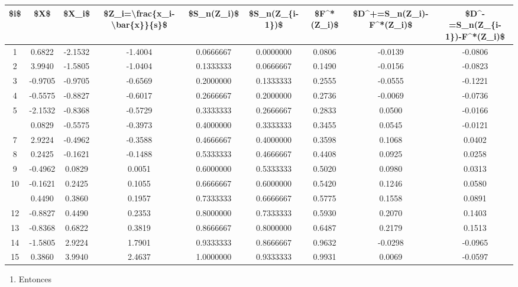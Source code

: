 \documentclass[
  a4paper,
  oneside,
  openany]{book}
\providecommand{\tightlist}{%
  \setlength{\itemsep}{0pt}\setlength{\parskip}{0pt}}
\begin{document}
\begin{table}[H]
\centering
\begin{tabular}{ccccccccc}
\toprule
\$i\$ & \$X\$ & \$X\_i\$ & \$Z\_i=\textbackslash{}frac\{x\_i-\textbackslash{}bar\{x\}\}\{s\}\$ & \$S\_n(Z\_i)\$ & \$S\_n(Z\_\{i-1\})\$ & \$F\textasciicircum{}*(Z\_i)\$ & \$D\textasciicircum{}+=S\_n(Z\_i)-F\textasciicircum{}*(Z\_i)\$ & \$D\textasciicircum{}-=S\_n(Z\_\{i-1\})-F\textasciicircum{}*(Z\_i)\$\\
\midrule
1 & 0.6822 & -2.1532 & -1.4004 & 0.0666667 & 0.0000000 & 0.0806 & -0.0139 & -0.0806\\
2 & 3.9940 & -1.5805 & -1.0404 & 0.1333333 & 0.0666667 & 0.1490 & -0.0156 & -0.0823\\
3 & -0.9705 & -0.9705 & -0.6569 & 0.2000000 & 0.1333333 & 0.2555 & -0.0555 & -0.1221\\
4 & -0.5575 & -0.8827 & -0.6017 & 0.2666667 & 0.2000000 & 0.2736 & -0.0069 & -0.0736\\
5 & -2.1532 & -0.8368 & -0.5729 & 0.3333333 & 0.2666667 & 0.2833 & 0.0500 & -0.0166\\
\addlinespace
6 & 0.0829 & -0.5575 & -0.3973 & 0.4000000 & 0.3333333 & 0.3455 & 0.0545 & -0.0121\\
7 & 2.9224 & -0.4962 & -0.3588 & 0.4666667 & 0.4000000 & 0.3598 & 0.1068 & 0.0402\\
8 & 0.2425 & -0.1621 & -0.1488 & 0.5333333 & 0.4666667 & 0.4408 & 0.0925 & 0.0258\\
9 & -0.4962 & 0.0829 & 0.0051 & 0.6000000 & 0.5333333 & 0.5020 & 0.0980 & 0.0313\\
10 & -0.1621 & 0.2425 & 0.1055 & 0.6666667 & 0.6000000 & 0.5420 & 0.1246 & 0.0580\\
\addlinespace
11 & 0.4490 & 0.3860 & 0.1957 & 0.7333333 & 0.6666667 & 0.5775 & 0.1558 & 0.0891\\
12 & -0.8827 & 0.4490 & 0.2353 & 0.8000000 & 0.7333333 & 0.5930 & 0.2070 & 0.1403\\
13 & -0.8368 & 0.6822 & 0.3819 & 0.8666667 & 0.8000000 & 0.6487 & 0.2179 & 0.1513\\
14 & -1.5805 & 2.9224 & 1.7901 & 0.9333333 & 0.8666667 & 0.9632 & -0.0298 & -0.0965\\
15 & 0.3860 & 3.9940 & 2.4637 & 1.0000000 & 0.9333333 & 0.9931 & 0.0069 & -0.0597\\
\bottomrule
\end{tabular}
\end{table}

\begin{enumerate}
\def\labelenumi{\arabic{enumi})}
\setcounter{enumi}{8}
\tightlist
\item
  Entonces
\end{enumerate}
\end{document}
